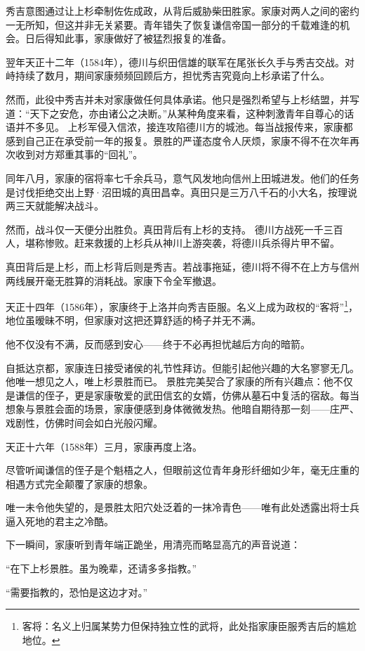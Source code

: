 \documentclass[
]{article}
\begin{document}
秀吉意图通过让上杉牵制佐佐成政，从背后威胁柴田胜家。家康对两人之间的密约一无所知，但这并非无关紧要。青年错失了恢复谦信帝国一部分的千载难逢的机会。日后得知此事，家康做好了被猛烈报复的准备。

翌年天正十二年（1584年），德川与织田信雄的联军在尾张长久手与秀吉交战。对峙持续了数月，期间家康频频回顾后方，担忧秀吉究竟向上杉承诺了什么。

然而，此役中秀吉并未对家康做任何具体承诺。他只是强烈希望与上杉结盟，并写道：``天下之安危，亦由诸公之决断。''从某种角度来看，这种刺激青年自尊心的话语并不多见。
上杉军侵入信浓，接连攻陷德川方的城池。每当战报传来，家康都感到自己正在承受前一年的报复。景胜的严谨态度令人厌烦，家康不得不在次年再次收到对方郑重其事的``回礼''。

同年八月，家康的宿将率七千余兵马，意气风发地向信州上田城进发。他们的任务是讨伐拒绝交出上野·沼田城的真田昌幸。真田只是三万八千石的小大名，按理说两三天就能解决战斗。

然而，战斗仅一天便分出胜负。真田背后有上杉的支持。
德川方战死一千三百人，堪称惨败。赶来救援的上杉兵从神川上游突袭，将德川兵杀得片甲不留。

真田背后是上杉，而上杉背后则是秀吉。若战事拖延，德川将不得不在上方与信州两线展开毫无胜算的消耗战。家康下令全军撤退。

天正十四年（1586年），家康终于上洛并向秀吉臣服。名义上成为政权的``客将''\footnote{客将：名义上归属某势力但保持独立性的武将，此处指家康臣服秀吉后的尴尬地位。}，地位虽暧昧不明，但家康对这把还算舒适的椅子并无不满。

他不仅没有不满，反而感到安心------终于不必再担忧越后方向的暗箭。

自抵达京都，家康连日接受诸侯的礼节性拜访。但能引起他兴趣的大名寥寥无几。他唯一想见之人，唯上杉景胜而已。
景胜完美契合了家康的所有兴趣点：他不仅是谦信的侄子，更是家康敬爱的武田信玄的女婿，仿佛从墓石中复活的宿敌。每当想象与景胜会面的场景，家康便感到身体微微发热。他暗自期待那一刻------庄严、戏剧性，仿佛时间会如白光般闪耀。

天正十六年（1588年）三月，家康再度上洛。

尽管听闻谦信的侄子是个魁梧之人，但眼前这位青年身形纤细如少年，毫无庄重的相遇方式完全颠覆了家康的想象。

唯一未令他失望的，是景胜太阳穴处泛着的一抹冷青色------唯有此处透露出将士兵逼入死地的君主之冷酷。

下一瞬间，家康听到青年端正跪坐，用清亮而略显高亢的声音说道：

``在下上杉景胜。虽为晚辈，还请多多指教。''

``需要指教的，恐怕是这边才对。''
\end{document}
